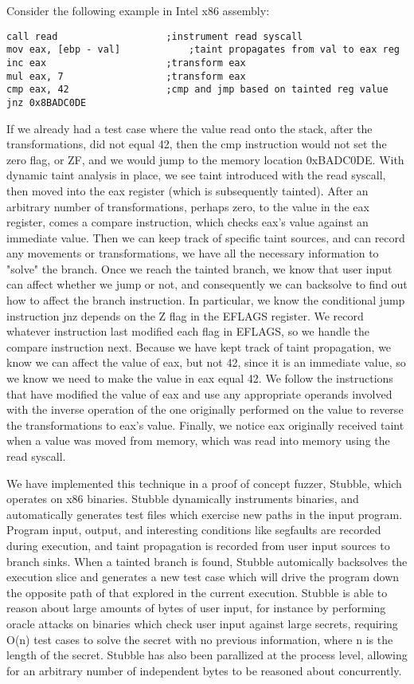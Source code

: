 \documentclass[11pt,expanded,copyright]{fsuthesis}
\begin{document}
Consider the following example in Intel x86 assembly:

\begin{lstlisting}[style=asmstyle]
call read					;instrument read syscall
mov eax, [ebp - val]	        ;taint propagates from val to eax reg
inc eax						;transform eax
mul eax, 7					;transform eax
cmp eax, 42					;cmp and jmp based on tainted reg value
jnz 0x8BADC0DE
\end{lstlisting}

If we already had a test case where the value read onto the stack, after the transformations, did not equal 42, then the cmp instruction would not set the zero flag, or ZF, and we would jump to the memory location 0xBADC0DE. With dynamic taint analysis in place, we see taint introduced with the read syscall, then moved into the eax register (which is subsequently tainted). After an arbitrary number of transformations, perhaps zero, to the value in the eax register, comes a compare instruction, which checks eax's value against an immediate value. Then we can keep track of specific taint sources, and can record any movements or transformations, we have all the necessary information to "solve" the branch. Once we reach the tainted branch, we know that user input can affect whether we jump or not, and consequently we can backsolve to find out how to affect the branch instruction. In particular, we know the conditional jump instruction jnz depends on the Z flag in the EFLAGS register. We record whatever instruction last modified each flag in EFLAGS, so we handle the compare instruction next. Because we have kept track of taint propagation, we know we can affect the value of eax, but not 42, since it is an immediate value, so we know we need to make the value in eax equal 42. We follow the instructions that have modified the value of eax and use any appropriate operands involved with the inverse operation of the one originally performed on the value to reverse the transformations to eax's value. Finally, we notice eax originally received taint when a value was moved from memory, which was read into memory using the read syscall.

We have implemented this technique in a proof of concept fuzzer, Stubble, which operates on x86 binaries. Stubble dynamically instruments binaries, and automatically generates test files which exercise new paths in the input program. Program input, output, and interesting conditions like segfaults are recorded during execution, and taint propagation is recorded from user input sources to branch sinks. When a tainted branch is found, Stubble automically backsolves the execution slice and generates a new test case which will drive the program down the opposite path of that explored in the current execution. Stubble is able to reason about large amounts of bytes of user input, for instance by performing oracle attacks on binaries which check user input against large secrets, requiring O(n) test cases to solve the secret with no previous information, where n is the length of the secret. Stubble has also been parallized at the process level, allowing for an arbitrary number of independent bytes to be reasoned about concurrently. 
\end{document}
